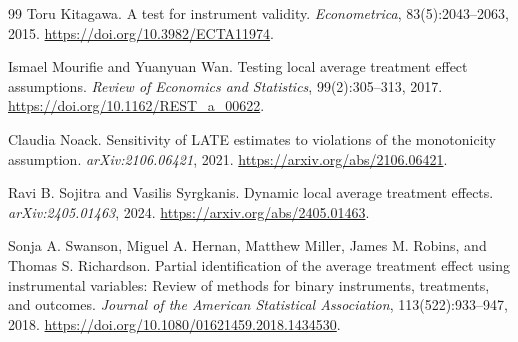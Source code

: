 \documentclass[11pt]{article}
\theoremstyle{definition}
\theoremstyle{plain}
\theoremstyle{remark}
\begin{document}
\begin{thebibliography}{99}
Toru Kitagawa.
\newblock A test for instrument validity.
\newblock \emph{Econometrica}, 83(5):2043--2063, 2015.
\newblock \url{https://doi.org/10.3982/ECTA11974}.

Ismael Mourifie and Yuanyuan Wan.
\newblock Testing local average treatment effect assumptions.
\newblock \emph{Review of Economics and Statistics}, 99(2):305--313, 2017.
\newblock \url{https://doi.org/10.1162/REST_a_00622}.

Claudia Noack.
\newblock Sensitivity of LATE estimates to violations of the monotonicity assumption.
\newblock \emph{arXiv:2106.06421}, 2021.
\newblock \url{https://arxiv.org/abs/2106.06421}.

Ravi B. Sojitra and Vasilis Syrgkanis.
\newblock Dynamic local average treatment effects.
\newblock \emph{arXiv:2405.01463}, 2024.
\newblock \url{https://arxiv.org/abs/2405.01463}.

Sonja A. Swanson, Miguel A. Hernan, Matthew Miller, James M. Robins, and Thomas S. Richardson.
\newblock Partial identification of the average treatment effect using instrumental variables: Review of methods for binary instruments, treatments, and outcomes.
\newblock \emph{Journal of the American Statistical Association}, 113(522):933--947, 2018.
\newblock \url{https://doi.org/10.1080/01621459.2018.1434530}.
\end{thebibliography}
\end{document}
